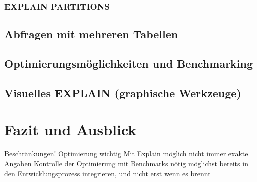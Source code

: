 \subsubsection{EXPLAIN PARTITIONS}
\subsection{Abfragen mit mehreren Tabellen}
\subsection{Optimierungsmöglichkeiten und Benchmarking}
\subsection{Visuelles EXPLAIN (graphische Werkzeuge)}

\section{Fazit und Ausblick}

Beschränkungen!
Optimierung wichtig
Mit Explain möglich
nicht immer exakte Angaben
Kontrolle der Optimierung mit Benchmarks nötig
möglichst bereits in den Entwicklungsprozess integrieren, und nicht erst wenn es brennt
